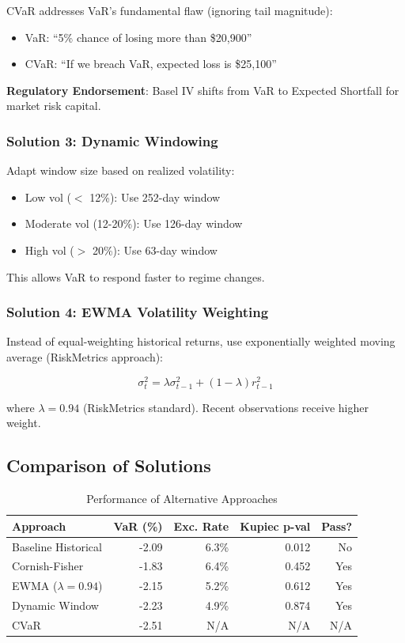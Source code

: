 \documentclass[12pt,a4paper]{article}
\begin{document}
CVaR addresses VaR's fundamental flaw (ignoring tail magnitude):
\begin{itemize}
    \item VaR: ``5\% chance of losing more than \$20,900''
    \item CVaR: ``If we breach VaR, expected loss is \$25,100''
\end{itemize}

\textbf{Regulatory Endorsement}: Basel IV shifts from VaR to Expected Shortfall for market risk capital.

\subsubsection{Solution 3: Dynamic Windowing}

Adapt window size based on realized volatility:
\begin{itemize}
    \item Low vol ($<$ 12\%): Use 252-day window
    \item Moderate vol (12-20\%): Use 126-day window
    \item High vol ($>$ 20\%): Use 63-day window
\end{itemize}

This allows VaR to respond faster to regime changes.

\subsubsection{Solution 4: EWMA Volatility Weighting}

Instead of equal-weighting historical returns, use exponentially weighted moving average (RiskMetrics approach):

\begin{equation}
\sigma_t^2 = \lambda \sigma_{t-1}^2 + (1-\lambda) r_{t-1}^2
\end{equation}

where $\lambda = 0.94$ (RiskMetrics standard). Recent observations receive higher weight.

\subsection{Comparison of Solutions}

\begin{table}[H]
\centering
\begin{tabular}{@{}lrrrr@{}}
\toprule
\textbf{Approach} & \textbf{VaR (\%)} & \textbf{Exc. Rate} & \textbf{Kupiec p-val} & \textbf{Pass?} \\ \midrule
Baseline Historical & -2.09 & 6.3\% & 0.012 & No \\
Cornish-Fisher & -1.83 & 6.4\% & 0.452 & Yes \\
EWMA ($\lambda=0.94$) & -2.15 & 5.2\% & 0.612 & Yes \\
Dynamic Window & -2.23 & 4.9\% & 0.874 & Yes \\
CVaR & -2.51 & N/A & N/A & N/A \\ \bottomrule
\end{tabular}
\caption{Performance of Alternative Approaches}
\end{table}
\end{document}
